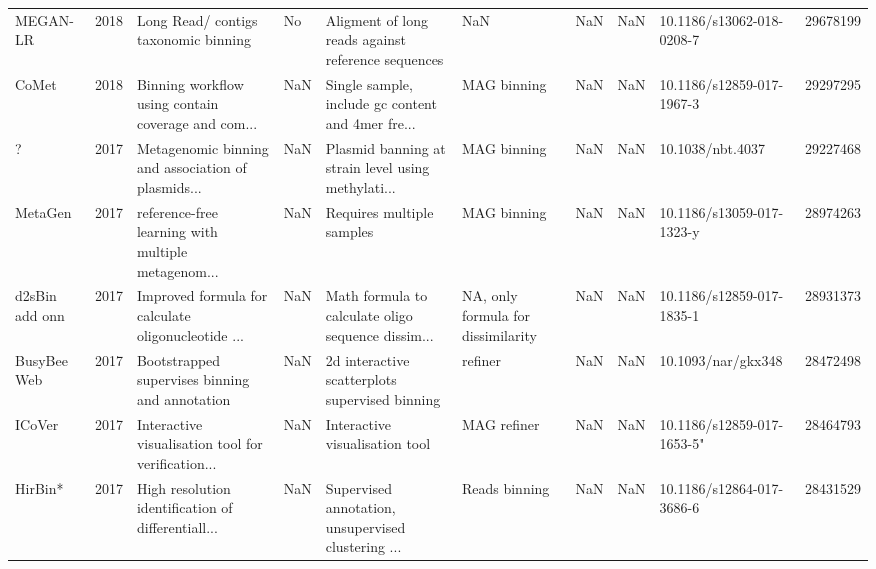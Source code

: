 \begin{tabular}{lrlllllllr}
                  MEGAN-LR &  2018 &              Long Read/ contigs taxonomic binning  &             No & Aligment of long reads against reference sequences &                                       NaN &                                            NaN &                        NaN &      10.1186/s13062-018-0208-7 &  29678199 \\
                     CoMet &  2018 & Binning workflow using contain coverage and com... &            NaN & Single sample, include gc content  and 4mer fre... &                               MAG binning &                                            NaN &                        NaN &      10.1186/s12859-017-1967-3 &  29297295 \\
                         ? &  2017 & Metagenomic binning and association of plasmids... &            NaN & Plasmid banning at strain level using methylati... &                               MAG binning &                                            NaN &                        NaN &               10.1038/nbt.4037 &  29227468 \\
                   MetaGen &  2017 & reference-free learning with multiple metagenom... &            NaN &                          Requires multiple samples &                               MAG binning &                                            NaN &                        NaN &      10.1186/s13059-017-1323-y &  28974263 \\
            d2sBin add onn &  2017 & Improved formula for calculate oligonucleotide ... &            NaN & Math formula to calculate oligo sequence dissim... &        NA, only formula for dissimilarity &                                            NaN &                        NaN &      10.1186/s12859-017-1835-1 &  28931373 \\
               BusyBee Web &  2017 &     Bootstrapped supervises binning and annotation &            NaN &     2d interactive scatterplots supervised binning &                                   refiner &                                            NaN &                        NaN &             10.1093/nar/gkx348 &  28472498 \\
                    ICoVer &  2017 & Interactive visualisation tool for verification... &            NaN &                     Interactive visualisation tool &                               MAG refiner &                                            NaN &                        NaN &     10.1186/s12859-017-1653-5" &  28464793 \\
                   HirBin* &  2017 & High resolution identification of differentiall... &            NaN & Supervised annotation, unsupervised clustering ... &                             Reads binning &                                            NaN &                        NaN &      10.1186/s12864-017-3686-6 &  28431529 \\

\end{tabular}
